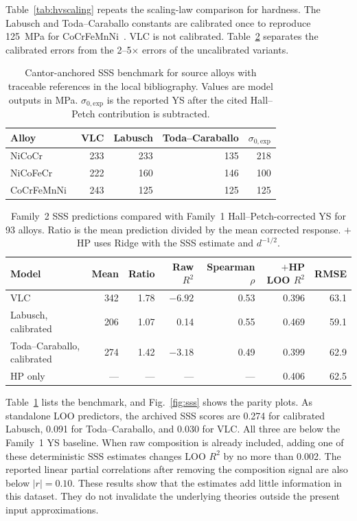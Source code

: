 \documentclass[a4paper,11pt]{article}
\begin{document}
Table~\ref{tab:hvscaling} repeats the scaling-law comparison for hardness. The Labusch and Toda--Caraballo constants are calibrated once to reproduce \SI{125}{MPa} for CoCrFeMnNi~\cite{Otto2013}. VLC is not calibrated. Table~\ref{tab:sss} separates the calibrated errors from the 2--5$\times$ errors of the uncalibrated variants.

\begin{table}[H]
\centering
\caption{Cantor-anchored SSS benchmark for source alloys with traceable references in the local bibliography. Values are model outputs in MPa. $\sigma_{0,\mathrm{exp}}$ is the reported YS after the cited Hall--Petch contribution is subtracted.}
\label{tab:sssbenchmark}
\small
\begin{tabular}{lrrrr}
\toprule
Alloy & VLC & Labusch & Toda--Caraballo & $\sigma_{0,\mathrm{exp}}$ \\
\midrule
NiCoCr~\cite{Yoshida2017} & 233 & 233 & 135 & 218 \\
NiCoFeCr~\cite{Wu2014} & 222 & 160 & 146 & 100 \\
CoCrFeMnNi~\cite{Otto2013} & 243 & 125 & 125 & 125 \\
\bottomrule
\end{tabular}
\end{table}

\begin{table}[H]
\centering
\caption{Family~2 SSS predictions compared with Family~1 Hall--Petch-corrected YS for 93 alloys. Ratio is the mean prediction divided by the mean corrected response. $+$HP uses Ridge with the SSS estimate and $d^{-1/2}$.}
\label{tab:sss}
\small
\setlength{\tabcolsep}{5pt}
\begin{tabular}{lrrrrrr}
\toprule
Model & Mean & Ratio & Raw $R^2$ & Spearman $\rho$ & $+$HP LOO $R^2$ & RMSE \\
\midrule
VLC & 342 & 1.78 & $-6.92$ & 0.53 & 0.396 & 63.1 \\
Labusch, calibrated & 206 & 1.07 & 0.14 & 0.55 & 0.469 & 59.1 \\
Toda--Caraballo, calibrated & 274 & 1.42 & $-3.18$ & 0.49 & 0.399 & 62.9 \\
HP only & --- & --- & --- & --- & 0.406 & 62.5 \\
\bottomrule
\end{tabular}
\end{table}

Table~\ref{tab:sssbenchmark} lists the benchmark, and Fig.~\ref{fig:sss} shows the parity plots. As standalone LOO predictors, the archived SSS scores are 0.274 for calibrated Labusch, 0.091 for Toda--Caraballo, and 0.030 for VLC. All three are below the Family~1 YS baseline. When raw composition is already included, adding one of these deterministic SSS estimates changes LOO $R^2$ by no more than 0.002. The reported linear partial correlations after removing the composition signal are also below $|r|=0.10$. These results show that the estimates add little information in this dataset. They do not invalidate the underlying theories outside the present input approximations.
\end{document}

